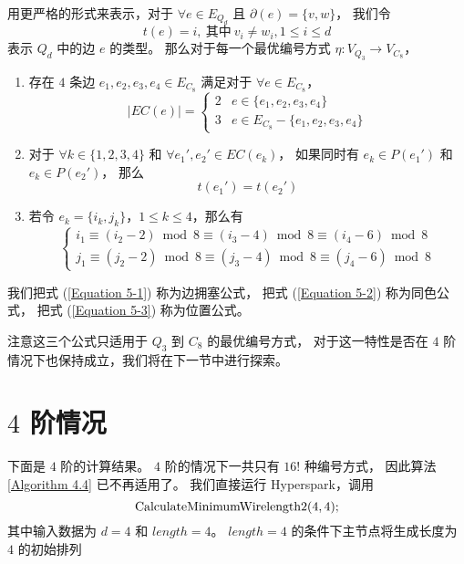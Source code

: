 用更严格的形式来表示，对于 $\forall e \in E_{Q_d}$ 且 $\partial(e) = \{v, w\}$，
我们令
\begin{equation*}
t(e) = i,\ \text{其中}\ v_i \neq w_i, 1 \le i \le d
\end{equation*}
表示 $Q_d$ 中的边 $e$ 的类型。
那么对于每一个最优编号方式 $\eta \colon V_{Q_3} \rightarrow V_{C_8}$，
\begin{enumerate}[(1)]
	\item 存在 $4$ 条边 $e_1, e_2, e_3, e_4 \in E_{C_8}$ 满足对于 $\forall e \in E_{C_8}$，
		\begin{equation}
		\label{Equation 5-1}
		|EC(e)| = \begin{cases}
			2 & e \in \{e_1, e_2, e_3, e_4\} \\
			3 & e \in E_{C_8} - \{e_1, e_2, e_3, e_4\}
		\end{cases}
		\end{equation}
	\item 对于 $\forall k \in \{1, 2, 3, 4\}$
		和 $\forall e_1', e_2' \in EC(e_k)$，
		如果同时有 $e_k \in P(e_1')$ 和 $e_k \in P(e_2')$，
		那么
		\begin{equation}
		\label{Equation 5-2}
		t(e_1') = t(e_2')
		\end{equation}
	\item 若令 $e_k = \{i_k, j_k\}$，$1 \le k \le 4$，那么有
		\begin{equation}
		\label{Equation 5-3}
		\begin{cases}
		i_1 \equiv (i_2 - 2) \bmod 8 \equiv (i_3 - 4) \bmod 8 \equiv (i_4 - 6) \bmod 8 \\
		j_1 \equiv (j_2 - 2) \bmod 8 \equiv (j_3 - 4) \bmod 8 \equiv (j_4 - 6) \bmod 8
		\end{cases}
		\end{equation}
\end{enumerate}

我们把式 (\ref{Equation 5-1}) 称为边拥塞公式，
把式 (\ref{Equation 5-2}) 称为同色公式，
把式 (\ref{Equation 5-3}) 称为位置公式。

注意这三个公式只适用于 $Q_3$ 到 $C_8$ 的最优编号方式，
对于这一特性是否在 $4$ 阶情况下也保持成立，我们将在下一节中进行探索。

\section{$4$ 阶情况}
\label{Section 5.3}

下面是 $4$ 阶的计算结果。
$4$ 阶的情况下一共只有 $16 !$ 种编号方式，
因此算法 \ref{Algorithm 4.4} 已不再适用了。
我们直接运行 Hyperspark，调用
\begin{equation*}
\textnormal{CalculateMinimumWirelength2}(4, 4);
\end{equation*}
其中输入数据为 $d = 4$ 和 $length = 4$。
$length = 4$ 的条件下主节点将生成长度为 $4$ 的初始排列

